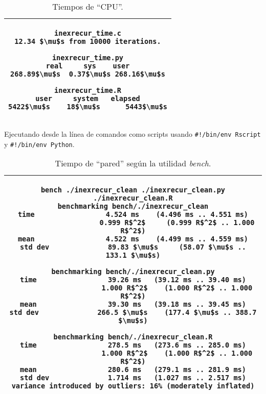 \documentclass{article}
\newcommand{\tempcaption}{}
\newenvironment{codesnip}[1]
{
\begin{table}[h!]
\gdef\tempcaption{#1}
\centering
\begin{tabular}{|c|}
\hline
}
{
\\\hline
\end{tabular}
\caption{\tempcaption}
\end{table}
}
\begin{document}
\clearpage
\phantom{}
\vfill
\begin{codesnip}{Tiempos de ``CPU''.}
\begin{lstlisting}
inexrecur_time.c
12.34 $\mu$s from 10000 iterations.

inexrecur_time.py
real     sys    user
268.89$\mu$s  0.37$\mu$s 268.16$\mu$s

inexrecur_time.R
user     system   elapsed
5422$\mu$s    18$\mu$s      5443$\mu$s
\end{lstlisting}
\end{codesnip}
\vfill
Ejecutando desde la línea de comandos como scripts usando
\texttt{\#!/bin/env Rscript} y \texttt{\#!/bin/env Python}.
\begin{codesnip}{Tiempo de ``pared'' según la utilidad \textit{bench}.}
\begin{lstlisting}
bench ./inexrecur_clean ./inexrecur_clean.py ./inexrecur_clean.R
benchmarking bench/./inexrecur_clean
time                 4.524 ms    (4.496 ms .. 4.551 ms)
                     0.999 R$^2$     (0.999 R$^2$ .. 1.000 R$^2$)
mean                 4.522 ms    (4.499 ms .. 4.559 ms)
std dev              89.83 $\mu$s     (58.07 $\mu$s .. 133.1 $\mu$s)

benchmarking bench/./inexrecur_clean.py
time                 39.26 ms   (39.12 ms .. 39.40 ms)
                     1.000 R$^2$    (1.000 R$^2$ .. 1.000 R$^2$)
mean                 39.30 ms   (39.18 ms .. 39.45 ms)
std dev              266.5 $\mu$s    (177.4 $\mu$s .. 388.7 $\mu$s)

benchmarking bench/./inexrecur_clean.R
time                 278.5 ms   (273.6 ms .. 285.0 ms)
                     1.000 R$^2$    (1.000 R$^2$ .. 1.000 R$^2$)
mean                 280.6 ms   (279.1 ms .. 281.9 ms)
std dev              1.714 ms   (1.027 ms .. 2.517 ms)
variance introduced by outliers: 16% (moderately inflated)
\end{lstlisting}
\end{codesnip}
\vfill
\end{document}
